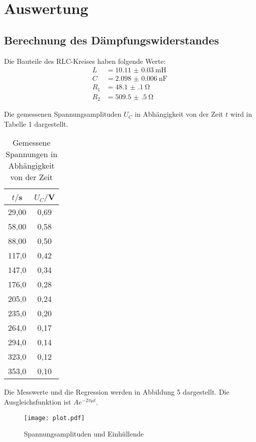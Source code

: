 \section{Auswertung}
\label{sec:Auswertung}

\subsection{Berechnung des Dämpfungswiderstandes}

Die Bauteile des RLC-Kreises haben folgende Werte:
\begin{align*}
  L &= \SI{10.11(3)}{\milli\henry} \\
  C &= \SI{2.098(6)}{\nano\farad} \\
  R_1 &= \SI{48.1(1)}{\ohm} \\
  R_2 &= \SI{509.5(5)}{\ohm}
\end{align*}

Die gemessenen Spannungsamplituden $U_C$ in Abhängigkeit von der Zeit $t$ wird in Tabelle 1 dargestellt.

\begin{table}[H]
  \centering
  \caption{Gemessene Spannungen in Abhängigkeit von der Zeit}
  \label{tab:Spannungsamplitude}
  \begin{tabular}{c c}
    \toprule
    $t/$s & $U_C/$V \\
    \midrule
    29,00 & 0,69 \\
    58,00 & 0,58 \\
    88,00 & 0,50 \\
    117,0 & 0,42 \\
    147,0 & 0,34 \\
    176,0 & 0,28 \\
    205,0 & 0,24 \\
    235,0 & 0,20 \\
    264,0 & 0,17 \\
    294,0 & 0,14 \\
    323,0 & 0,12 \\
    353,0 & 0,10 \\
    \bottomrule
  \end{tabular}
\end{table}

Die Messwerte und die Regression werden in Abbildung 5 dargestellt. Die Ausgleichsfunktion ist $Ae^{-2\pi \mu t}$.

\begin{figure}[H]
  \centering
  \texttt{[image: plot.pdf]}
  \caption{Spannungsamplituden und Einhüllende}
  \label{fig:plot}
\end{figure}

